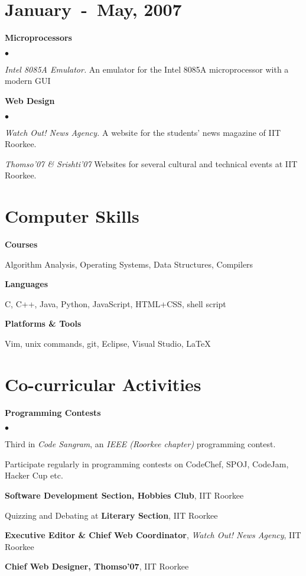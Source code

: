 \documentclass[margin,line]{res}
\newcommand{\datesection}[1]{\section{\textnormal{\scriptsize \textcolor{subtle}{#1}}}}
\newenvironment{list1}{
  \begin{list}{\ding{113}}{%
      \setlength{\itemsep}{0in}
      \setlength{\parsep}{0in} \setlength{\parskip}{0in}
      \setlength{\topsep}{0in} \setlength{\partopsep}{0in} 
      \setlength{\leftmargin}{0.17in}}}{\end{list}}
\newenvironment{list2}{
  \begin{list}{$\bullet$}{%
      \setlength{\itemsep}{0in}
      \setlength{\parsep}{0in} \setlength{\parskip}{0in}
      \setlength{\topsep}{0in} \setlength{\partopsep}{0in} 
      \setlength{\leftmargin}{0.2in}}}{\end{list}}
\begin{document}
\begin{resume}
\datesection{January~-~May, 2007}
{\bf Microprocessors}
\begin{list2}
\item {\em Intel 8085A Emulator.} An emulator for the Intel 8085A microprocessor with a modern GUI
\end{list2}

{\bf Web Design}
\begin{list2}
\item {\em Watch Out! News Agency.} A website for the students' news magazine of IIT Roorkee.
\item {\em Thomso'07 \& Srishti'07} Websites for several cultural and technical events at IIT Roorkee.
\end{list2}

\section{\sc Computer Skills} 
\textbf{Courses}
	\begin{list1}
		\item[]  Algorithm Analysis, Operating Systems, Data Structures, Compilers
	\end{list1}

\textbf{Languages}
	\begin{list1}
		\item[]  C, C++, Java, Python, JavaScript, HTML+CSS, shell script
	\end{list1}

\textbf{Platforms \& Tools}
	\begin{list1}
		\item[] Vim, unix commands, git, Eclipse, Visual Studio, \LaTeX{}
	\end{list1}

\section{\sc Co-curricular Activities}
{\bf Programming Contests}
\begin{list2}
\item Third in {\em Code Sangram}, an {\em IEEE (Roorkee chapter)} programming contest.
\item Participate regularly in programming contests on CodeChef, SPOJ, CodeJam, Hacker Cup etc.
\end{list2}

{\bf Software Development Section, Hobbies Club}, IIT Roorkee

Quizzing and Debating at {\bf Literary Section}, IIT Roorkee

{\bf Executive Editor \& Chief Web Coordinator}, {\em Watch Out! News Agency}, IIT Roorkee

{\bf Chief Web Designer, Thomso'07}, IIT Roorkee

\end{resume}
\end{document}
